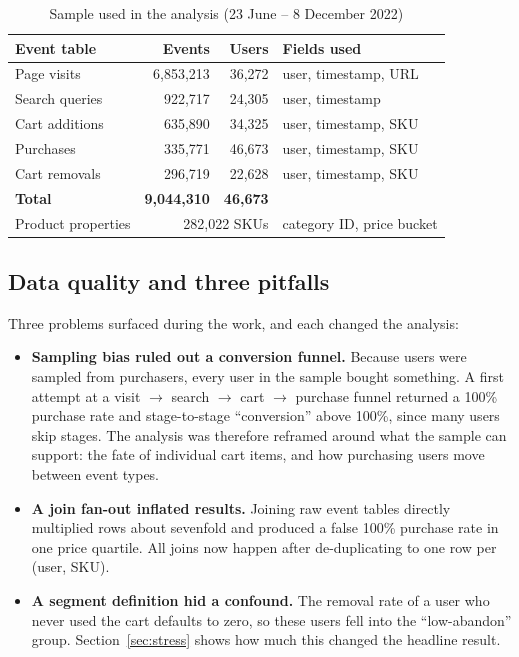 \documentclass[11pt, a4paper]{article}
\begin{document}
\begin{table}[!htbp]
\centering\small
\caption{Sample used in the analysis (23 June -- 8 December 2022)}
\label{tab:data}
\begin{tabular}{lrrl}
\toprule
\textbf{Event table} & \textbf{Events} & \textbf{Users} & \textbf{Fields used} \\
\midrule
Page visits & 6,853,213 & 36,272 & user, timestamp, URL \\
Search queries & 922,717 & 24,305 & user, timestamp \\
Cart additions & 635,890 & 34,325 & user, timestamp, SKU \\
Purchases & 335,771 & 46,673 & user, timestamp, SKU \\
Cart removals & 296,719 & 22,628 & user, timestamp, SKU \\
\midrule
\textbf{Total} & \textbf{9,044,310} & \textbf{46,673} & \\
\addlinespace
Product properties & \multicolumn{2}{r}{282,022 SKUs} & category ID, price bucket \\
\bottomrule
\end{tabular}
\end{table}

\subsection{Data quality and three pitfalls}
Three problems surfaced during the work, and each changed the analysis:
\begin{itemize}
  \item \textbf{Sampling bias ruled out a conversion funnel.} Because users were sampled from purchasers, every user in the sample bought something. A first attempt at a visit $\to$ search $\to$ cart $\to$ purchase funnel returned a 100\% purchase rate and stage-to-stage ``conversion'' above 100\%, since many users skip stages. The analysis was therefore reframed around what the sample can support: the fate of individual cart items, and how purchasing users move between event types.
  \item \textbf{A join fan-out inflated results.} Joining raw event tables directly multiplied rows about sevenfold and produced a false 100\% purchase rate in one price quartile. All joins now happen after de-duplicating to one row per (user, SKU).
  \item \textbf{A segment definition hid a confound.} The removal rate of a user who never used the cart defaults to zero, so these users fell into the ``low-abandon'' group. Section~\ref{sec:stress} shows how much this changed the headline result.
\end{itemize}
\end{document}

